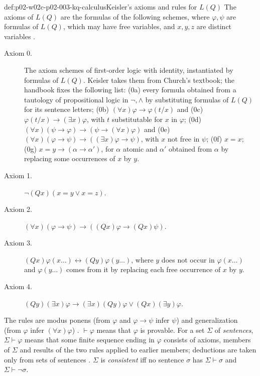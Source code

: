 \begin{hbdefinition}{def:p02-w02c-p02-003-kq-calculus}{Keisler's axioms and rules for \(L(Q)\)}
The axioms of \(L(Q)\) are the formulas of the following schemes, where
\(\varphi,\psi\) are formulas of \(L(Q)\), which may have free variables,
and \(x,y,z\) are distinct variables \cite[\S1, p.~6]{Keisler1970}.
\begin{description}
\item[Axiom 0.] The axiom schemes of first-order logic with identity,
      instantiated by formulas of \(L(Q)\).  Keisler takes them from
      Church's textbook; the handbook fixes the following list:
      (0a) every formula obtained from a tautology of propositional logic in
      \(\neg,\land\) by substituting formulas of \(L(Q)\) for its sentence
      letters; (0b) \((\forall x)\varphi\to\varphi(t/x)\) and (0c)
      \(\varphi(t/x)\to(\exists x)\varphi\), with \(t\) substitutable for
      \(x\) in \(\varphi\); (0d) \((\forall x)(\psi\to\varphi)\to(\psi\to(\forall
      x)\varphi)\) and (0e) \((\forall x)(\varphi\to\psi)\to((\exists
      x)\varphi\to\psi)\), with \(x\) not free in \(\psi\); (0f) \(x=x\); (0g)
      \(x=y\to(\alpha\to\alpha')\), for \(\alpha\) atomic and \(\alpha'\)
      obtained from \(\alpha\) by replacing some occurrences of \(x\) by
      \(y\).
\item[Axiom 1.] \(\neg(Qx)(x=y\lor x=z)\).
\item[Axiom 2.] \((\forall x)(\varphi\to\psi)\to((Qx)\varphi\to(Qx)\psi)\).
\item[Axiom 3.] \((Qx)\varphi(x\ldots)\leftrightarrow(Qy)\varphi(y\ldots)\),
      where \(y\) does not occur in \(\varphi(x\ldots)\) and
      \(\varphi(y\ldots)\) comes from it by replacing each free occurrence of
      \(x\) by \(y\).
\item[Axiom 4.] \((Qy)(\exists x)\varphi\to(\exists x)(Qy)\varphi\lor(Qx)(\exists y)\varphi\).
\end{description}
The rules are modus ponens (from \(\varphi\) and \(\varphi\to\psi\) infer
\(\psi\)) and generalization (from \(\varphi\) infer \((\forall x)\varphi\))
\cite[\S1, p.~7]{Keisler1970}.  \(\vdash\varphi\) means that \(\varphi\) is
provable.  For a set \(\Sigma\) of \emph{sentences}, \(\Sigma\vdash\varphi\)
means that some finite sequence ending in \(\varphi\) consists of axioms,
members of \(\Sigma\) and results of the two rules applied to earlier
members; deductions are taken only from sets of sentences
\cite[\S1, p.~7]{Keisler1970}.  \(\Sigma\) is \emph{consistent} iff no
sentence \(\sigma\) has \(\Sigma\vdash\sigma\) and \(\Sigma\vdash\neg\sigma\).
\end{hbdefinition}

